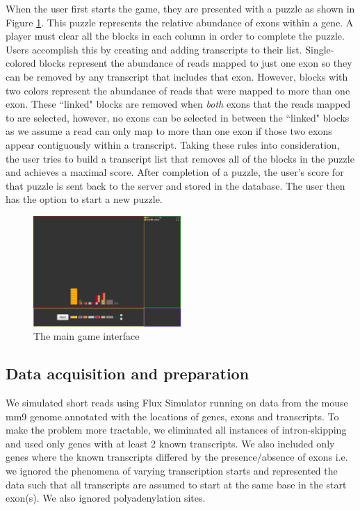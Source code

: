 \documentclass[12pt]{article}
\begin{document}
When the user first starts the game, they are presented with a puzzle as shown in Figure \ref{fig:gamescreen}. This puzzle represents
the relative abundance of exons within a gene. A player must clear all the blocks in each column in order to complete the puzzle. Users accomplish this by 
creating and adding transcripts to their list. Single-colored blocks represent the abundance of reads mapped to just one exon so they can be removed by any 
transcript that includes that exon. However, blocks with two colors represent the abundance of reads that were mapped to more than one exon. These ``linked"
blocks are removed when \emph{both} exons that the reads mapped to are selected, however, no exons can be selected in between the ``linked" blocks as
we assume a read can only map to more than one exon if those two exons appear contiguously within a transcript. Taking these rules into consideration, the user
tries to build a transcript list that removes all of the blocks in the puzzle and achieves a maximal score. After completion of a puzzle, the user's score for that puzzle is
sent back to the server and stored in the database. The user then has the option to start a new puzzle.
\begin{figure}[t]
\centering
\includegraphics[width=0.5\textwidth]{gamescreen}
\caption{The main game interface}
\label{fig:gamescreen}
\end{figure}
\subsection*{Data acquisition and preparation}
We simulated short reads using Flux Simulator \citep{sammeth2010flux} running on data from the mouse mm9 genome annotated with the locations of genes, exons and transcripts. To make the problem more tractable, we eliminated all instances of intron-skipping and used only genes with at least 2 known transcripts. We also included only genes where the known transcripts differed by the presence/absence of exons i.e. we ignored the phenomena of varying transcription starts and represented the data such that all transcripts are assumed to start at the same base in the start exon(s). We also ignored polyadenylation sites. 
\end{document}
